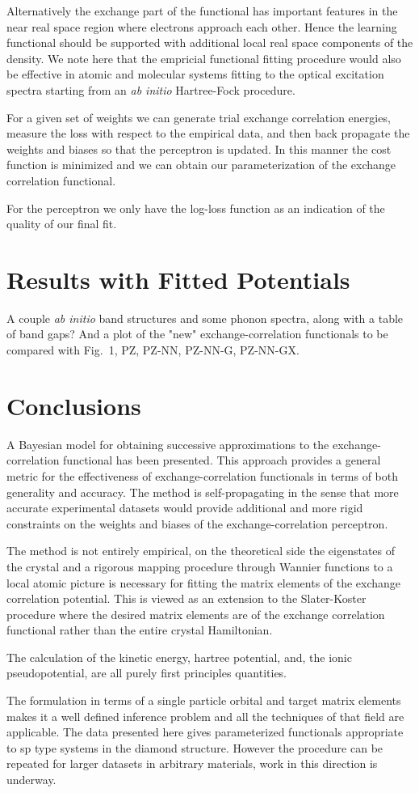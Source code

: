 Alternatively the exchange part of the functional has important features in the near real space
region where electrons approach each other. Hence the learning functional should be supported with
additional local real space components of the density. We note here that the empricial functional fitting procedure
would also be effective in atomic and molecular systems fitting to the optical excitation spectra starting
from an {\it ab initio} Hartree-Fock procedure.

For a given set of weights we can generate trial exchange correlation energies, 
measure the loss with respect to the empirical data, and then back propagate the 
weights and biases so that the perceptron is updated. In this manner the cost 
function is minimized and we can obtain our parameterization of the exchange correlation functional.

For the perceptron we only have the log-loss function as an indication of the quality 
of our final fit. 

\section{Results with Fitted Potentials}
  A couple {\it ab initio} band structures and some phonon spectra, along with a table of band gaps?
And a plot of the "new" exchange-correlation functionals to be compared with 
Fig.~1, PZ, PZ-NN, PZ-NN-G, PZ-NN-GX.

\section{Conclusions}
A Bayesian model for obtaining successive approximations to the exchange-correlation functional
has been presented. This approach provides a general metric for the effectiveness of exchange-correlation
functionals in terms of both generality and accuracy. The method is self-propagating in the
sense that more accurate experimental datasets would provide additional and more rigid constraints
on the weights and biases of the exchange-correlation perceptron.

The method is not entirely empirical, on the theoretical side
the eigenstates of the crystal and a rigorous mapping procedure 
through Wannier functions to a local atomic picture is necessary for 
fitting the matrix elements of the exchange correlation potential.
This is viewed as an extension to the Slater-Koster procedure
where the desired matrix elements are of the exchange
correlation functional rather than the entire crystal Hamiltonian.

The calculation of the kinetic energy, hartree potential, and, the ionic
pseudopotential, are all purely first principles quantities.

The formulation in terms of a single particle orbital and
target matrix elements makes it a well defined inference
problem and all the techniques of that field are applicable.
The data presented here gives parameterized functionals appropriate to
sp type systems in the diamond structure. However the procedure can be repeated for larger
datasets in arbitrary materials, work in this direction is underway.


